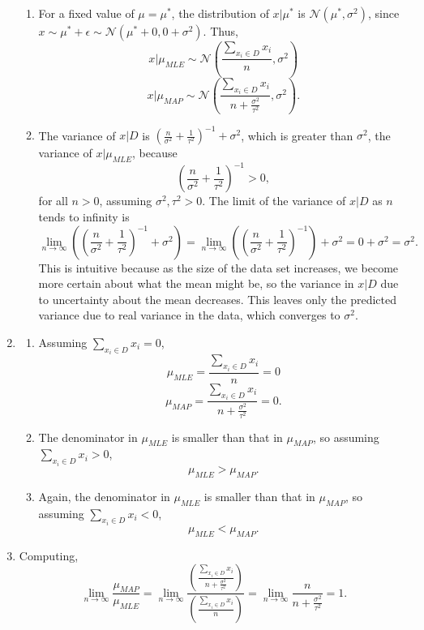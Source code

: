 \documentclass[submit]{harvardml}
\begin{document}
\begin{enumerate}
\begin{enumerate}
	\item For a fixed value of $\mu = \mu^*$, the distribution of $x|\mu^*$ is $\mathcal{N}(\mu^*, \sigma^2)$, since $x \sim \mu^* + \epsilon \sim \mathcal{N}(\mu^* + 0, 0 + \sigma^2)$. Thus,
	$$x|\mu_{MLE} \sim \mathcal{N}\left(\frac{\sum_{x_i \in D} x_i}{n}, \sigma^2\right)$$
	$$x|\mu_{MAP} \sim \mathcal{N}\left(\frac{\sum_{x_i \in D} x_i}{n + \frac{\sigma^2}{\tau^2}}, \sigma^2\right).$$
	
	\item The variance of $x|D$ is $\left(\frac{n}{\sigma^2} + \frac1{\tau^2}\right)^{-1} + \sigma^2$, which is greater than $\sigma^2$, the variance of $x|\mu_{MLE}$, because
	$$\left(\frac{n}{\sigma^2} + \frac1{\tau^2}\right)^{-1} > 0,$$
	for all $n>0$, assuming $\sigma^2, \tau^2 > 0$. The limit of the variance of $x|D$ as $n$ tends to infinity is
	$$\lim_{n \rightarrow \infty} \left(\left(\frac{n}{\sigma^2} + \frac1{\tau^2}\right)^{-1} + \sigma^2\right) = \lim_{n \rightarrow \infty} \left(\left(\frac{n}{\sigma^2} + \frac1{\tau^2}\right)^{-1}\right) + \sigma^2 = 0 + \sigma^2 = \sigma^2.$$
	This is intuitive because as the size of the data set increases, we become more certain about what the mean might be, so the variance in $x|D$ due to uncertainty about the mean decreases. This leaves only the predicted variance due to real variance in the data, which converges to $\sigma^2$.

	\end{enumerate}
	
	\item	
	\begin{enumerate}
		\item Assuming $\sum_{x_i \in D} x_i=0$,
		$$\mu_{MLE} = \frac{\sum_{x_i \in D} x_i}{n} = 0$$
		$$\mu_{MAP} = \frac{\sum_{x_i \in D} x_i}{n + \frac{\sigma^2}{\tau^2}} = 0.$$

		\item The denominator in $\mu_{MLE}$ is smaller than that in $\mu_{MAP}$, so assuming $\sum_{x_i \in D} x_i>0$,
		$$\mu_{MLE} > \mu_{MAP}.$$
		
		\item Again, the denominator in $\mu_{MLE}$ is smaller than that in $\mu_{MAP}$, so assuming $\sum_{x_i \in D} x_i<0$,
		$$\mu_{MLE} < \mu_{MAP}.$$
		
	\end{enumerate}
	
	\item Computing,
	$$\lim_{n \rightarrow \infty} \frac{\mu_{MAP}}{\mu_{MLE}}
	= \lim_{n \rightarrow \infty} \frac{\left(\frac{\sum_{x_i \in D} x_i}{n + \frac{\sigma^2}{\tau^2}}\right)}{\left(\frac{\sum_{x_i \in D} x_i}{n}\right)} = \lim_{n \rightarrow \infty} \frac{n}{n + \frac{\sigma^2}{\tau^2}} = 1.$$

\end{enumerate}
\end{document}
